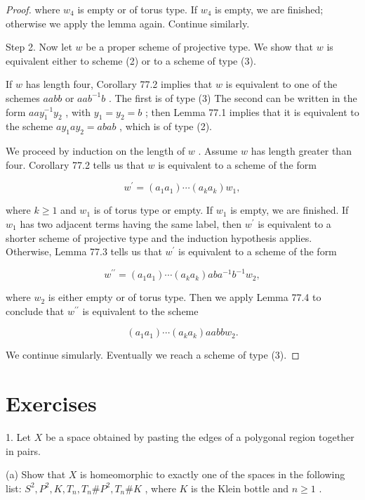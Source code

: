 \begin{proof}
where \({w}_{4}\) is empty or of torus type. If \({w}_{4}\) is empty, we are finished; otherwise we apply the lemma again. Continue similarly.

Step 2. Now let \(w\) be a proper scheme of projective type. We show that \(w\) is equivalent either to scheme (2) or to a scheme of type (3).

If \(w\) has length four, Corollary 77.2 implies that \(w\) is equivalent to one of the schemes \({aabb}\) or \({aa}{b}^{-1}b\) . The first is of type (3) The second can be written in the form \({aa}{y}_{1}^{-1}{y}_{2}\) , with \({y}_{1} = {y}_{2} = b\) ; then Lemma 77.1 implies that it is equivalent to the scheme \(a{y}_{1}a{y}_{2} = {abab}\) , which is of type (2).

We proceed by induction on the length of \(w\) . Assume \(w\) has length greater than four. Corollary 77.2 tells us that \(w\) is equivalent to a scheme of the form

\[
{w}^{\prime } = \left( {{a}_{1}{a}_{1}}\right) \cdots \left( {{a}_{k}{a}_{k}}\right) {w}_{1},
\]

where \(k \geq  1\) and \({w}_{1}\) is of torus type or empty. If \({w}_{1}\) is empty, we are finished. If \({w}_{1}\) has two adjacent terms having the same label, then \({w}^{\prime }\) is equivalent to a shorter scheme of projective type and the induction hypothesis applies. Otherwise, Lemma 77.3 tells us that \({w}^{\prime }\) is equivalent to a scheme of the form

\[
{w}^{\prime \prime } = \left( {{a}_{1}{a}_{1}}\right) \cdots \left( {{a}_{k}{a}_{k}}\right) {ab}{a}^{-1}{b}^{-1}{w}_{2},
\]

where \({w}_{2}\) is either empty or of torus type. Then we apply Lemma 77.4 to conclude that \({w}^{\prime \prime }\) is equivalent to the scheme

\[
\left( {{a}_{1}{a}_{1}}\right) \cdots \left( {{a}_{k}{a}_{k}}\right) {aabb}{w}_{2}.
\]

We continue simularly. Eventually we reach a scheme of type (3).
\end{proof}
\section*{Exercises}

1. Let \(X\) be a space obtained by pasting the edges of a polygonal region together in pairs.

(a) Show that \(X\) is homeomorphic to exactly one of the spaces in the following list: \({S}^{2},{P}^{2},K,{T}_{n},{T}_{n}\# {P}^{2},{T}_{n}\# K\) , where \(K\) is the Klein bottle and \(n \geq  1\) .

